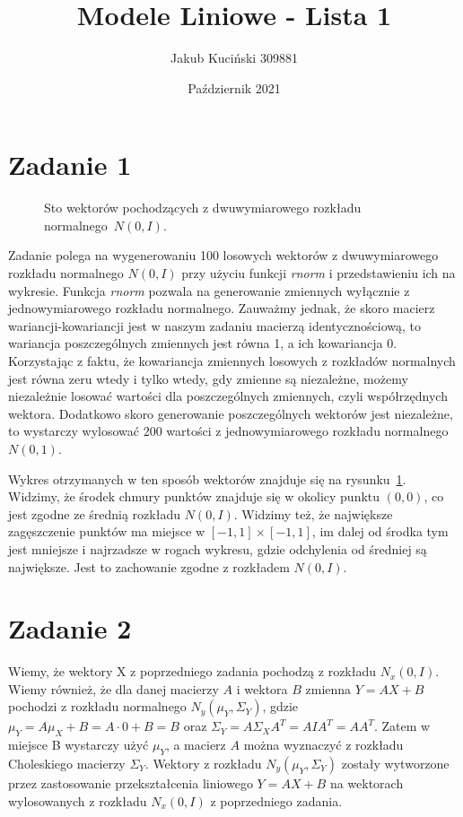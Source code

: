 \documentclass{article}
\title{Modele Liniowe - Lista 1}
\author{Jakub Kuciński 309881}
\date{Październik 2021}
\begin{document}
\maketitle


\section{Zadanie 1}
\begin{figure}[htbp]
  \centering
  
  \caption{Sto wektorów pochodzących z dwuwymiarowego rozkładu normalnego~$N(0,I)$.}
  \label{fig:rozklad-dwuwymiarowy-standardowy}
\end{figure}
Zadanie polega na wygenerowaniu 100 losowych wektorów z dwuwymiarowego rozkładu normalnego $N(0,I)$ przy użyciu funkcji \textit{rnorm} i przedstawieniu ich na wykresie. Funkcja \textit{rnorm} pozwala na generowanie zmiennych wyłącznie z jednowymiarowego rozkładu normalnego. Zauważmy jednak, że skoro macierz wariancji-kowariancji jest w naszym zadaniu macierzą identycznościową, to wariancja poszczególnych zmiennych jest równa 1, a ich kowariancja 0. Korzystając z faktu, że kowariancja zmiennych losowych z rozkładów normalnych jest równa zeru wtedy i tylko wtedy, gdy zmienne są niezależne, możemy niezależnie losować wartości dla poszczególnych zmiennych, czyli współrzędnych wektora. Dodatkowo skoro generowanie poszczególnych wektorów jest niezależne, to wystarczy wylosować 200 wartości z jednowymiarowego rozkładu normalnego $N(0, 1)$. 

Wykres otrzymanych w ten sposób wektorów znajduje się na rysunku~\ref{fig:rozklad-dwuwymiarowy-standardowy}. Widzimy, że środek chmury punktów znajduje się w okolicy punktu $(0, 0)$, co jest zgodne ze średnią rozkładu $N(0, I)$. Widzimy też, że największe zagęszczenie punktów ma miejsce w $[-1, 1] \times [-1, 1]$, im dalej od środka tym jest mniejsze i najrzadsze w rogach wykresu, gdzie odchylenia od średniej są największe. Jest to zachowanie zgodne z rozkładem $N(0, I)$.

\section{Zadanie 2}
Wiemy, że wektory X z poprzedniego zadania pochodzą z rozkładu $N_x(0, I)$. Wiemy również, że dla danej macierzy $A$ i wektora $B$ zmienna $Y = AX + B$ pochodzi z rozkładu normalnego $N_y(\mu_Y, \Sigma_Y)$, gdzie $\mu_Y = A\mu_X + B = A \cdot 0 + B = B$ oraz $\Sigma_Y = A\Sigma_X A^T = A I A^T = AA^T$. Zatem w miejsce B wystarczy użyć $\mu_Y$, a macierz $A$ można wyznaczyć z rozkładu Choleskiego macierzy $\Sigma_Y$. Wektory z rozkładu $N_y(\mu_Y, \Sigma_Y)$ zostały wytworzone przez zastosowanie przekształcenia liniowego $Y = AX + B$ na wektorach wylosowanych z rozkładu $N_x(0, I)$ z poprzedniego zadania.
\end{document}
